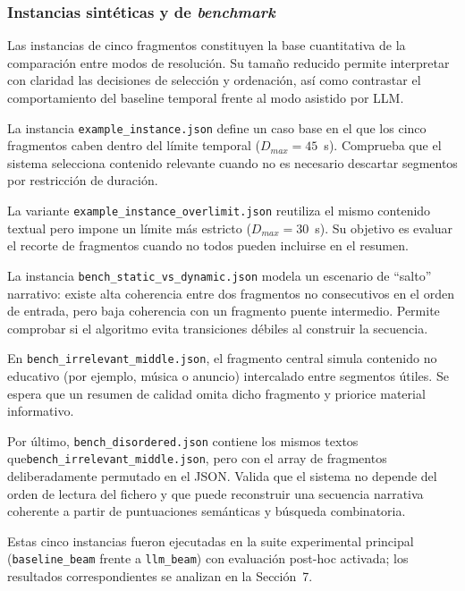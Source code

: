 \documentclass[12pt,a4paper]{article}
\begin{document}
\subsubsection{Instancias sintéticas y de \textit{benchmark}}

Las instancias de cinco fragmentos constituyen la base cuantitativa de la comparación entre modos de resolución. Su tamaño reducido permite interpretar con claridad las decisiones de selección y ordenación, así como contrastar el comportamiento del baseline temporal frente al modo asistido por LLM.

La instancia \texttt{example\_instance.json} define un caso base en el que los cinco fragmentos caben dentro del límite temporal (\(D_{max} = 45\)~s). Comprueba que el sistema selecciona contenido relevante cuando no es necesario descartar segmentos por restricción de duración.

La variante \texttt{example\_instance\_overlimit.json} reutiliza el mismo contenido textual pero impone un límite más estricto (\(D_{max} = 30\)~s). Su objetivo es evaluar el recorte de fragmentos cuando no todos pueden incluirse en el resumen.

La instancia \texttt{bench\_static\_vs\_dynamic.json} modela un escenario de ``salto'' narrativo: existe alta coherencia entre dos fragmentos no consecutivos en el orden de entrada, pero baja coherencia con un fragmento puente intermedio. Permite comprobar si el algoritmo evita transiciones débiles al construir la secuencia.

En \texttt{bench\_irrelevant\_middle.json}, el fragmento central simula contenido no educativo (por ejemplo, música o anuncio) intercalado entre segmentos útiles. Se espera que un resumen de calidad omita dicho fragmento y priorice material informativo.

Por último, \texttt{bench\_disordered.json} contiene los mismos textos que\linebreak \texttt{bench\_irrelevant\_middle.json}, pero con el array de fragmentos deliberadamente permutado en el JSON. Valida que el sistema no depende del orden de lectura del fichero y que puede reconstruir una secuencia narrativa coherente a partir de puntuaciones semánticas y búsqueda combinatoria.

Estas cinco instancias fueron ejecutadas en la suite experimental principal \linebreak (\texttt{baseline\_beam} frente a \texttt{llm\_beam}) con evaluación post-hoc activada; los resultados correspondientes se analizan en la Sección~7.
\end{document}
